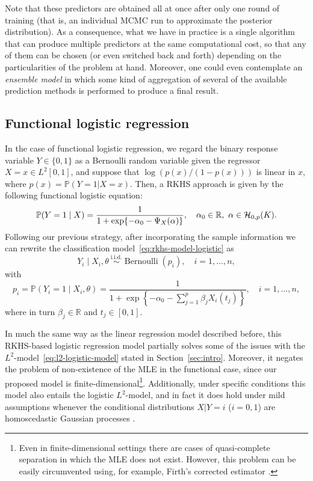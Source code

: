 \documentclass[ba]{imsart}
\numberwithin{equation}{section}
\theoremstyle{plain}
\newcommand{\R}{\mathbb{R}}
\newcommand{\Hcal}{\ensuremath\mathcal{H}}
\begin{document}
Note that these predictors are obtained all at once after only one round of training (that is, an individual MCMC run to approximate the posterior distribution). As a consequence, what we have in practice is a single algorithm that can produce multiple predictors at the same computational cost, so that any of them can be chosen (or even switched back and forth) depending on the particularities of the problem at hand. Moreover, one could even contemplate an \textit{ensemble model} in which some kind of aggregation of several of the available prediction methods is performed to produce a final result.

\subsection{Functional logistic regression}\label{sec:rkhs-logistic-model}

In the case of functional logistic regression, we regard the binary response variable \(Y\in\{0, 1\}\) as a Bernoulli random variable given the regressor \(X=x \in L^2[0, 1]\), and suppose that \(\log\left(p(x)/(1-p(x))\right)\) is linear in \(x\), where \(p(x)=\mathbb P(Y=1| X=x)\). Then, a RKHS approach is given by the following functional logistic equation:
\begin{equation}\label{eq:rkhs-model-logistic}
  \mathbb P(Y=1 \mid X) = \frac{1}{1 + \exp\{-\alpha_0 - \Psi_X(\alpha)\}}, \quad \alpha_0 \in \R, \ \alpha \in \Hcal_{0,p}(K).
\end{equation}
Following our previous strategy, after incorporating the sample information we can rewrite the classification model~\eqref{eq:rkhs-model-logistic} as
\begin{equation}\label{eq:rkhs-model-logistic-2}
Y_i \mid X_i,\theta \ \stackrel{\text{i.i.d.}}{\sim} \operatorname{Bernoulli}(p_i), \quad i=1,\dots, n,
\end{equation}
with
\begin{equation}\label{eq:rkhs-model-logistic-2-parameter}
  p_i = \mathbb P(Y_i=1 \mid X_i,\theta) = \frac{1}{\displaystyle 1 + \exp\left\{-\alpha_0 - \sum_{j=1}^p \beta_j X_i(t_j)\right\}}, \quad i=1,\dots, n,
\end{equation}
where in turn \(\beta_j\in\R\) and \(t_j\in[0, 1]\).

In much the same way as the linear regression model described before, this RKHS-based logistic regression model partially solves some of the issues with the \(L^2\)-model~\eqref{eq:l2-logistic-model} stated in Section~\ref{sec:intro}. Moreover, it negates the problem of non-existence of the MLE in the functional case, since our proposed model is finite-dimensional\footnote{Even in finite-dimensional settings there are cases of quasi-complete separation in which the MLE does not exist. However, this problem can be easily circumvented using, for example, Firth's corrected estimator \citep{firth1993bias}.}. Additionally, under specific conditions this model also entails the logistic \(L^2\)-model, and in fact it does hold under mild assumptions whenever the conditional distributions \(X | Y=i\) (\(i=0,1\)) are homoscedastic Gaussian processes \citep[see Theorem 1 in][]{berrendero2021functional}.
\end{document}
